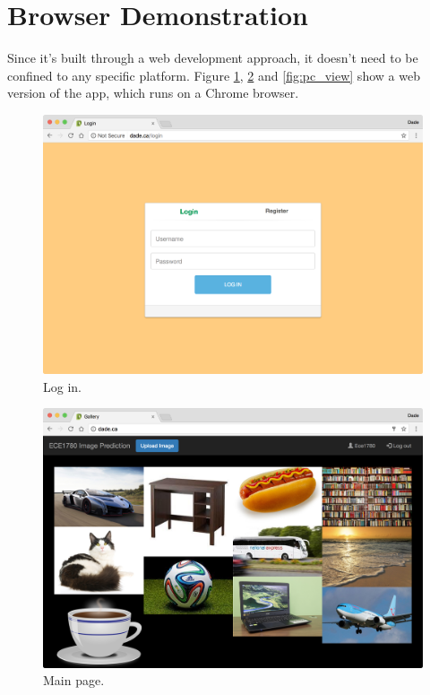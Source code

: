 \documentclass[conference]{IEEEtran}
\begin{document}
\section{Browser Demonstration}
Since it's built through a web development approach, it doesn't need to be confined to any specific platform. Figure \ref{fig:pc_login}, \ref{fig:pc_main} and \ref{fig:pc_view} show a web version of the app, which runs on a Chrome browser.

\begin{figure}[h!]
  \centering
  \includegraphics[width=\linewidth]{pc_login.png}
  \caption{Log in.}
  \label{fig:pc_login}
\end{figure}

\begin{figure}[h!]
  \centering
  \includegraphics[width=\linewidth]{pc_main.png}
  \caption{Main page.}
  \label{fig:pc_main}
\end{figure}
\end{document}
